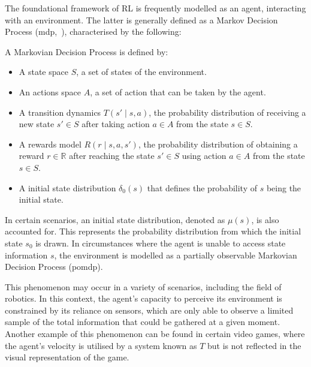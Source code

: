 The foundational framework of RL is frequently modelled as an agent, interacting with an environment.
The latter is generally defined as a Markov Decision Process (\acrshort{mdp},~\citep{bellman1957markovian}),
characterised by the following:
\begin{definition}[MDP]\label{definition:bg:rl:mdp} A Markovian Decision Process is defined by:
\begin{itemize}
    \item A state space $S$, a set of states of the environment.
    \item An actions space $A$, a set of action that can be taken by the agent.
    \item A transition dynamics $T(s' \mid s,a)$, the probability distribution of receiving a new state $s' \in S$ after
taking action $a \in A$ from the state $s \in S$. %
    \item A rewards model $R(r \mid s, a, s')$, the probability distribution of obtaining a reward $r\in \mathbb{R}$ after
reaching the state $s' \in S$ using action $a \in A$ from the state $s \in S$.
    \item A initial state distribution $\delta_0(s)$ that defines the probability of $s$ being the initial state.
\end{itemize}
\end{definition}
In certain scenarios, an initial state distribution, denoted as $\mu(s)$, is also accounted for.
This represents the probability distribution from which the initial state $s_0$ is drawn.
In circumstances where the agent is unable to access state information $s$, the environment is modelled as a partially
observable Markovian Decision Process (\acrshort{pomdp}).

This phenomenon may occur in a variety of scenarios, including the field of robotics.
In this context, the agent's capacity to perceive its environment is constrained by its reliance on sensors, which are
only able to observe a limited sample of the total information that could be gathered at a given moment.
Another example of this phenomenon can be found in certain video games, where the agent's velocity is utilised by a
system known as $T$ but is not reflected in the visual representation of the game.

